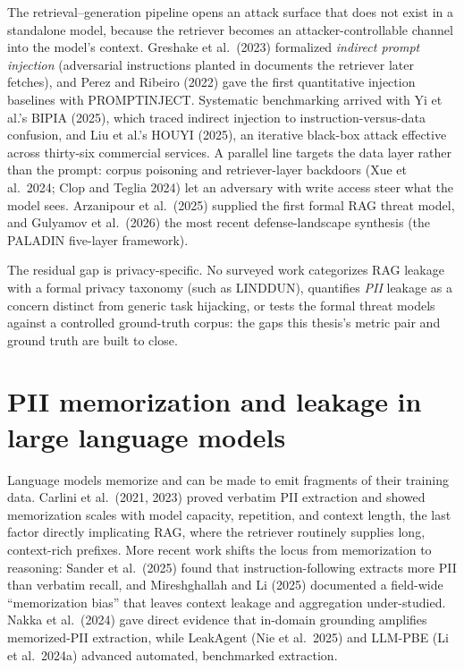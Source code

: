 \documentclass[12pt,a4paper]{report}
\begin{document}
The retrieval--generation pipeline opens an attack surface that does not exist in a standalone model,
because the retriever becomes an attacker-controllable channel into the model's context. Greshake et
al.\ (2023) formalized \emph{indirect prompt injection} (adversarial instructions planted in
documents the retriever later fetches), and Perez and Ribeiro (2022) gave the first quantitative
injection baselines with PROMPTINJECT. Systematic benchmarking arrived with Yi et al.'s BIPIA (2025),
which traced indirect injection to instruction-versus-data confusion, and Liu et al.'s HOUYI (2025),
an iterative black-box attack effective across thirty-six commercial services. A parallel line targets
the data layer rather than the prompt: corpus poisoning and retriever-layer backdoors (Xue et al.\
2024; Clop and Teglia 2024) let an adversary with write access steer what the model sees. Arzanipour
et al.\ (2025) supplied the first formal RAG threat model, and Gulyamov et al.\ (2026) the most recent
defense-landscape synthesis (the PALADIN five-layer framework).

The residual gap is privacy-specific. No surveyed work categorizes RAG leakage with a formal privacy
taxonomy (such as LINDDUN), quantifies \emph{PII} leakage as a concern distinct from generic task
hijacking, or tests the formal threat models against a controlled ground-truth corpus: the gaps
this thesis's metric pair and ground truth are built to close.

\section{PII memorization and leakage in large language models}
\label{sec:pii-leakage}

Language models memorize and can be made to emit fragments of their training data. Carlini et al.\
(2021, 2023) proved verbatim PII extraction and showed memorization scales with model capacity,
repetition, and context length, the last factor directly implicating RAG, where the retriever
routinely supplies long, context-rich prefixes. More recent work shifts the locus from memorization to
reasoning: Sander et al.\ (2025) found that instruction-following extracts more PII than verbatim
recall, and Mireshghallah and Li (2025) documented a field-wide ``memorization bias'' that leaves
context leakage and aggregation under-studied. Nakka et al.\ (2024) gave direct evidence that in-domain
grounding amplifies memorized-PII extraction\label{subsec:rag-amplification}, while LeakAgent (Nie et
al.\ 2025) and LLM-PBE (Li et al.\ 2024a) advanced automated, benchmarked extraction.
\end{document}
